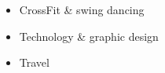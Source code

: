 \vspace{1.2em}

\twocolumnsection
{
\begin{skills}
\end{skills}}
{
\vspace{1em}
\begin{itemize}
	\item CrossFit \& swing dancing
	\item Technology \& graphic design
	\item Travel
\end{itemize}
}

